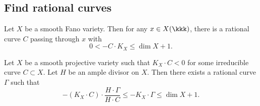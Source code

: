 \subsection{Find rational curves}

    \begin{theorem}\label{thm:rational_curve_on_smooth_fano}
        Let \(X\) be a smooth Fano variety.
        Then for any \(x \in X(\kkk)\), there is a rational curve \(C\) passing through \(x\) with 
        \[ 0 < - C \cdot K_X \leq \dim X + 1. \]
    \end{theorem}

    \begin{theorem}\label{thm:rational_curve_on_smooth_variety_with_not_nef_K}
        Let \(X\) be a smooth projective variety such that \(K_X \cdot C < 0\) for some irreducible curve \(C \subset X\).
        Let \(H\) be an ample divisor on \(X\).
        Then there exists a rational curve \(\Gamma\) such that
        \[ -(K_X \cdot C) \cdot \frac{H\cdot \Gamma}{H \cdot C} \leq -K_X \cdot \Gamma \leq \dim X + 1. \]
    \end{theorem}